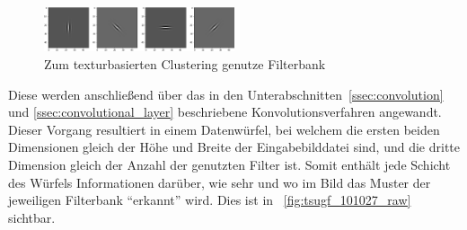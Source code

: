 \begin{figure}[h!]
	\centering
	\includegraphics[width=0.5\textwidth,keepaspectratio]{images/gen/tsugf_filters/filters.png}
	\captionsetup{width=0.5\textwidth,format=plain}
	\caption{Zum texturbasierten Clustering genutze Filterbank}
	\label{fig:tsugf_filters}
\end{figure}

Diese werden anschließend über das in den Unterabschnitten~\ref{ssec:convolution} und \ref{ssec:convolutional_layer} beschriebene Konvolutionsverfahren angewandt. Dieser Vorgang resultiert in einem Datenwürfel, bei welchem die ersten beiden Dimensionen gleich der Höhe und Breite der Eingabebilddatei sind, und die dritte Dimension gleich der Anzahl der genutzten Filter ist. Somit enthält jede Schicht des Würfels Informationen darüber, wie sehr und wo im Bild das Muster der jeweiligen Filterbank \enquote{erkannt} wird. Dies ist in \figurename~\ref{fig:tsugf_101027_raw} sichtbar.

